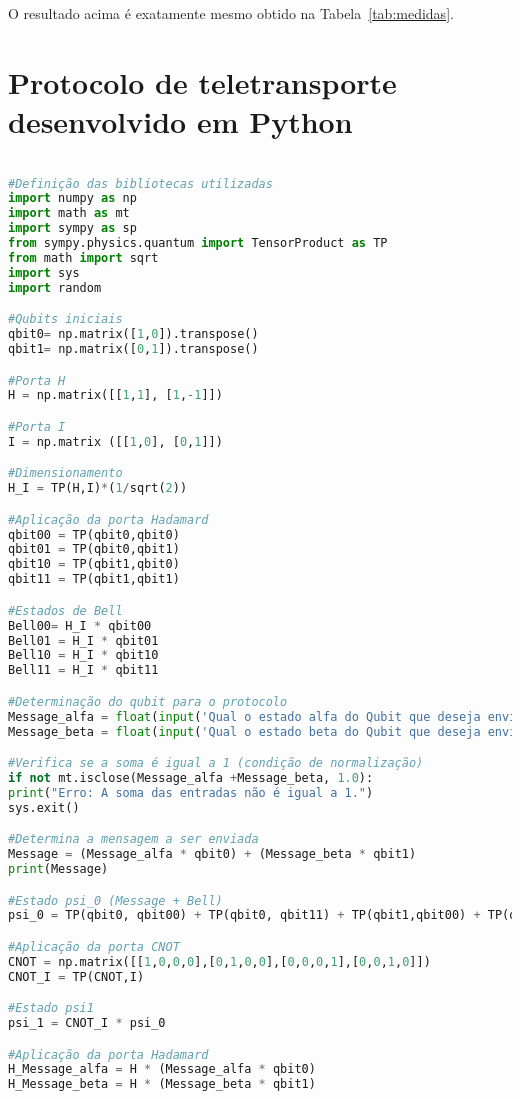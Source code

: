 O resultado acima é exatamente mesmo obtido na Tabela~\ref{tab:medidas}.

\clearpage

\chapter{Protocolo de teletransporte desenvolvido em Python}\label{app:protocolo}
\begin{lstlisting}[language=Python, caption=Protocolo de Teletransporte]

#Definição das bibliotecas utilizadas
import numpy as np
import math as mt
import sympy as sp
from sympy.physics.quantum import TensorProduct as TP
from math import sqrt
import sys
import random

#Qubits iniciais
qbit0= np.matrix([1,0]).transpose()
qbit1= np.matrix([0,1]).transpose()

#Porta H
H = np.matrix([[1,1], [1,-1]])

#Porta I
I = np.matrix ([[1,0], [0,1]])

#Dimensionamento
H_I = TP(H,I)*(1/sqrt(2))

#Aplicação da porta Hadamard
qbit00 = TP(qbit0,qbit0)
qbit01 = TP(qbit0,qbit1)
qbit10 = TP(qbit1,qbit0)
qbit11 = TP(qbit1,qbit1)

#Estados de Bell
Bell00= H_I * qbit00
Bell01 = H_I * qbit01
Bell10 = H_I * qbit10
Bell11 = H_I * qbit11

#Determinação do qubit para o protocolo
Message_alfa = float(input('Qual o estado alfa do Qubit que deseja enviar?'))
Message_beta = float(input('Qual o estado beta do Qubit que deseja enviar?'))

#Verifica se a soma é igual a 1 (condição de normalização)
if not mt.isclose(Message_alfa +Message_beta, 1.0):
print("Erro: A soma das entradas não é igual a 1.")
sys.exit()

#Determina a mensagem a ser enviada
Message = (Message_alfa * qbit0) + (Message_beta * qbit1)
print(Message)

#Estado psi_0 (Message + Bell)
psi_0 = TP(qbit0, qbit00) + TP(qbit0, qbit11) + TP(qbit1,qbit00) + TP(qbit1,qbit11)

#Aplicação da porta CNOT
CNOT = np.matrix([[1,0,0,0],[0,1,0,0],[0,0,0,1],[0,0,1,0]])
CNOT_I = TP(CNOT,I)

#Estado psi1
psi_1 = CNOT_I * psi_0

#Aplicação da porta Hadamard
H_Message_alfa = H * (Message_alfa * qbit0)
H_Message_beta = H * (Message_beta * qbit1)


\end{lstlisting}
